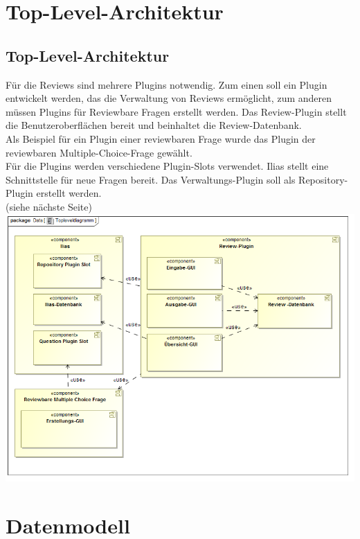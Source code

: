 \documentclass[a4paper]{scrreprt}
\begin{document}
\chapter{Top-Level-Architektur}
\section{Top-Level-Architektur}
Für die Reviews sind mehrere Plugins notwendig. Zum einen soll ein Plugin entwickelt werden, das die Verwaltung von Reviews ermöglicht, zum anderen müssen Plugins für Reviewbare Fragen erstellt werden. Das Review-Plugin stellt die Benutzeroberflächen bereit und beinhaltet die Review-Datenbank.\\
Als Beispiel für ein Plugin einer reviewbaren Frage wurde das Plugin der reviewbaren Multiple-Choice-Frage gewählt.\\
Für die Plugins werden verschiedene Plugin-Slots verwendet. Ilias stellt eine Schnittstelle für neue Fragen bereit. Das Verwaltungs-Plugin soll als Repository-Plugin erstellt werden.\\ 
(siehe nächste Seite)\\

\includegraphics[width=1.0\textwidth]{Component_Diagram__Topleveldiagramm.png}
\label{Toplevel-Architektur}

\chapter{Datenmodell}
\end{document}
